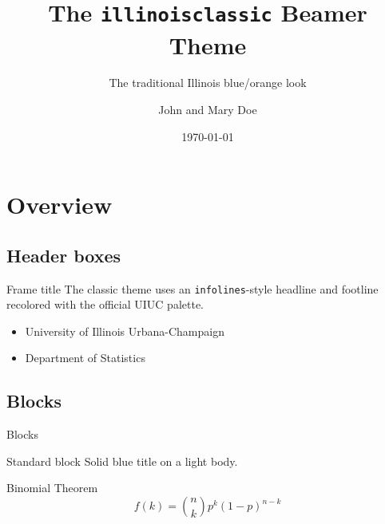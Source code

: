 \documentclass{beamer}
\title{The \texttt{illinoisclassic} Beamer Theme}
\subtitle{The traditional Illinois blue/orange look}
\author{John and Mary Doe}
\institute[UIUC]{University of Illinois Urbana-Champaign}
\date{\today}
\begin{document}
\frame{\titlepage}

\section{Overview}
\subsection{Header boxes}

\begin{frame}{Frame title}
  The classic theme uses an \texttt{infolines}-style headline and footline
  recolored with the official UIUC palette.
  \begin{itemize}
    \item University of Illinois Urbana-Champaign
    \item Department of Statistics
  \end{itemize}
\end{frame}

\subsection{Blocks}

\begin{frame}{Blocks}
  \begin{block}{Standard block}
    Solid blue title on a light body.
  \end{block}
  \begin{exampleblock}{Binomial Theorem}
    \begin{equation*}
      f\left(k\right) = \binom{n}{k} p^{k}\left(1-p\right)^{n-k}
    \end{equation*}
  \end{exampleblock}
\end{frame}
\end{document}

